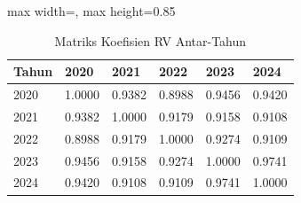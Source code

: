 \begin{table}[H]
\centering
\caption{Matriks Koefisien RV Antar-Tahun} \label{tab:rv}
\begin{adjustbox}{max width=\textwidth, max height=0.85\textheight}
\begin{tabular}{|m{}|m{}|m{}|m{}|m{}|m{}|}
\hline
\textbf{Tahun} & \textbf{2020} & \textbf{2021} & \textbf{2022} & \textbf{2023} & \textbf{2024} \\
\hline
2020 & 1.0000 & 0.9382 & 0.8988 & 0.9456 & 0.9420 \\
2021 & 0.9382 & 1.0000 & 0.9179 & 0.9158 & 0.9108 \\
2022 & 0.8988 & 0.9179 & 1.0000 & 0.9274 & 0.9109 \\
2023 & 0.9456 & 0.9158 & 0.9274 & 1.0000 & 0.9741 \\
2024 & 0.9420 & 0.9108 & 0.9109 & 0.9741 & 1.0000 \\
\hline
\end{tabular}
\end{adjustbox}
\end{table}